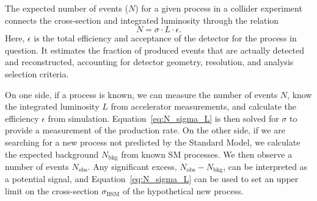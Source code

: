 The expected number of events ($N$) for a given process in a collider experiment connects the cross-section and integrated luminosity through the relation
\begin{equation}
N = \sigma \cdot L \cdot \epsilon.
\label{eq:N_sigma_L}
\end{equation}
Here, $\epsilon$ is the total efficiency and acceptance of the detector for the process in question. It estimates the fraction of produced events that are actually detected and reconstructed, accounting for detector geometry, resolution, and analysis selection criteria.

On one side, if a process is known, we can measure the number of events $N$, know the integrated luminosity $L$ from accelerator measurements, and calculate the efficiency $\epsilon$ from simulation. Equation~\ref{eq:N_sigma_L} is then solved for $\sigma$ to provide a measurement of the production rate. On the other side, if we are searching for a new process not predicted by the Standard Model, we calculate the expected background $N_\text{bkg}$ from known SM processes. We then observe a number of events $N_\text{obs}$. Any significant excess, $N_\text{obs} - N_\text{bkg}$, can be interpreted as a potential signal, and Equation~\ref{eq:N_sigma_L} can be used to set an upper limit on the cross-section $\sigma_\text{BSM}$ of the hypothetical new process.


